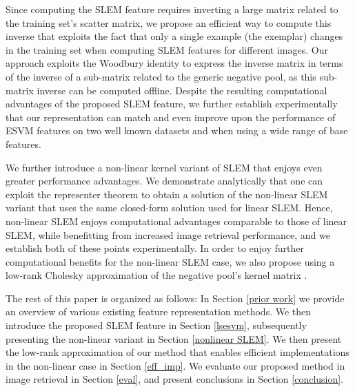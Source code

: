 Since computing the SLEM feature requires inverting a large matrix related to the training set's scatter matrix, we propose an efficient way to compute this inverse that exploits the fact that only a single example (the exemplar) changes in the training set when computing SLEM features for different images. Our approach exploits the Woodbury identity to express the inverse matrix in terms of the inverse of a sub-matrix related to the generic negative pool, as this sub-matrix inverse can be computed offline. Despite the resulting computational advantages of the proposed SLEM feature, we further establish experimentally that our representation can match and even improve upon the performance of ESVM features on two well known datasets and when using a wide range of base features. 

We further introduce a non-linear kernel variant of SLEM that enjoys even greater performance advantages. We demonstrate analytically that one can exploit the representer theorem to obtain a solution of the non-linear SLEM variant that uses the same closed-form solution used for linear SLEM. Hence, non-linear SLEM enjoys computational advantages comparable to those of linear SLEM, while benefitting from increased image retrieval performance, and we establish both of these points experimentally. In order to enjoy further computational benefits for the non-linear SLEM case, we also propose using a low-rank Cholesky approximation of the negative pool's  kernel matrix \cite{Bach}.

The rest of this paper is organized as follows: In Section \ref{prior work} we provide an overview of various existing feature representation methods. We then introduce the proposed SLEM feature in Section \ref{lsesvm}, subsequently presenting the non-linear variant in Section \ref{nonlinear SLEM}. We then present the low-rank approximation of our method that enables efficient implementations in the non-linear case in  Section \ref{eff_imp}. We evaluate our proposed method in image retrieval in Section \ref{eval}, and present conclusions in Section \ref{conclusion}.








